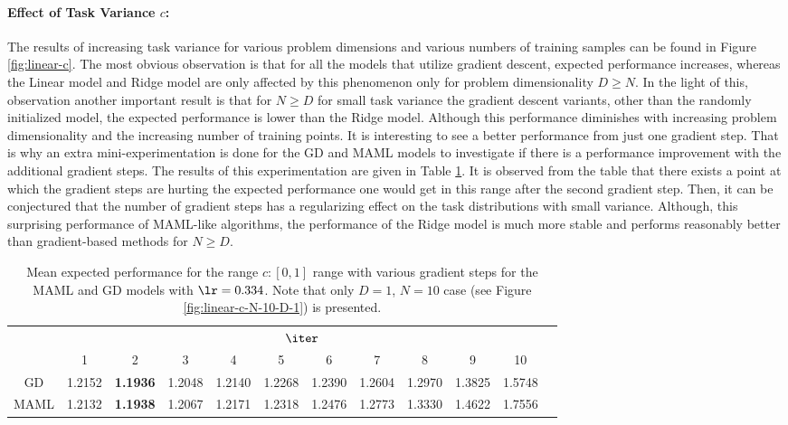 \paragraph{Effect of Task Variance $c$:} The results of increasing task variance for various problem dimensions and various numbers of training samples can be found in Figure \ref{fig:linear-c}. The most obvious observation is that for all the models that utilize gradient descent, expected performance increases, whereas the Linear model and Ridge model are only affected by this phenomenon only for problem dimensionality $D\geq N$. In the light of this, observation another important result is that for $N\geq D$  for small task variance the gradient descent variants, other than the randomly initialized model, the expected performance is lower than the Ridge model. Although this performance diminishes with increasing problem dimensionality and the increasing number of training points. It is interesting to see a better performance from just one gradient step. That is why an extra mini-experimentation is done for the GD and MAML models to investigate if there is a performance improvement with the additional gradient steps. The results of this experimentation are given in Table \ref{tab:zoom}. It is observed from the table that there exists a point at which the gradient steps are hurting the expected performance one would get in this range after the second gradient step. Then, it can be conjectured that the number of gradient steps has a regularizing effect on the task distributions with small variance. Although, this surprising performance of MAML-like algorithms, the performance of the Ridge model is much more stable and performs reasonably better than gradient-based methods for $N\geq D$.

\begin{table}
  \centering
  \caption{Mean expected performance for the range $c:[0,1]$ range with various gradient steps for the MAML and GD models with $\lr=0.334$. Note that only $D=1$, $N=10$ case (see Figure \ref{fig:linear-c-N-10-D-1}) is presented.}\label{tab:zoom}
  \begin{tabular}{c|c|c|c|c|c|c|c|c|c|c|c|}
    \cline{2-11}
     & \multicolumn{10}{|c|}{$\iter$}\\
    \cline{2-11}
     & 1 & 2 & 3 & 4 & 5 & 6 & 7 & 8 & 9 & 10\\
    \hline
    \multicolumn{1}{|c|}{GD} & 1.2152 &  \textbf{1.1936} & 1.2048 & 1.2140 &  1.2268 & 1.2390 & 1.2604 & 1.2970 &1.3825 & 1.5748\\
    \hline
    \multicolumn{1}{|c|}{MAML} & 1.2132 & \textbf{1.1938} & 1.2067 & 1.2171 & 1.2318 & 1.2476 & 1.2773 & 1.3330 & 1.4622 & 1.7556  \\
    \hline
    \end{tabular}
\end{table}

